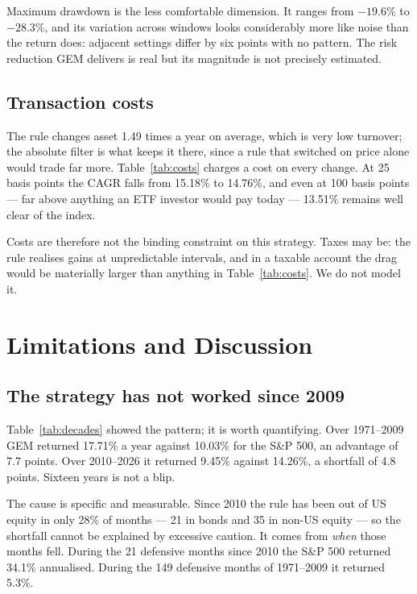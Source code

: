 \documentclass[11pt,a4paper]{article}
\let\oldsubsection\subsection
\renewcommand{\subsection}{\FloatBarrier\oldsubsection}
\let\oldsection\section
\renewcommand{\section}{\FloatBarrier\oldsection}
\begin{document}
Maximum drawdown is the less comfortable dimension. It ranges from $-19.6$\% to
$-28.3$\%, and its variation across windows looks considerably more like noise
than the return does: adjacent settings differ by six points with no pattern.
The risk reduction GEM delivers is real but its magnitude is not precisely
estimated.

\subsection{Transaction costs}

The rule changes asset 1.49 times a year on average, which is very low
turnover; the absolute filter is what keeps it there, since a rule that
switched on price alone would trade far more. Table~\ref{tab:costs} charges a
cost on every change. At 25 basis points the CAGR falls from 15.18\% to
14.76\%, and even at 100 basis points --- far above anything an ETF investor
would pay today --- 13.51\% remains well clear of the index.

\begin{table}[!ht]
  \centering
  \caption{Robustness to transaction costs.}
  \label{tab:costs}
  
\end{table}

Costs are therefore not the binding constraint on this strategy. Taxes may
be: the rule realises gains at unpredictable intervals, and in a taxable
account the drag would be materially larger than anything in
Table~\ref{tab:costs}. We do not model it.

\section{Limitations and Discussion}
\label{sec:limitations}

\subsection{The strategy has not worked since 2009}

Table~\ref{tab:decades} showed the pattern; it is worth quantifying. Over
1971--2009 GEM returned 17.71\% a year against 10.03\% for the S\&P 500, an
advantage of 7.7 points. Over 2010--2026 it returned 9.45\% against 14.26\%, a
shortfall of 4.8 points. Sixteen years is not a blip.

The cause is specific and measurable. Since 2010 the rule has been out of US
equity in only 28\% of months --- 21 in bonds and 35 in non-US equity --- so
the shortfall cannot be explained by excessive caution. It comes from
\emph{when} those months fell. During the 21 defensive months since 2010 the
S\&P 500 returned 34.1\% annualised. During the 149 defensive months of
1971--2009 it returned 5.3\%.
\end{document}
